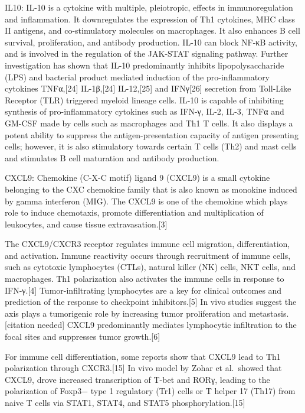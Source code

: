 \documentclass[
]{article}
\begin{document}
IL10: IL-10 is a cytokine with multiple, pleiotropic, effects in
immunoregulation and inflammation. It downregulates the expression of
Th1 cytokines, MHC class II antigens, and co-stimulatory molecules on
macrophages. It also enhances B cell survival, proliferation, and
antibody production. IL-10 can block NF-κB activity, and is involved in
the regulation of the JAK-STAT signaling pathway. Further investigation
has shown that IL-10 predominantly inhibits lipopolysaccharide (LPS) and
bacterial product mediated induction of the pro-inflammatory cytokines
TNFα,{[}24{]} IL-1β,{[}24{]} IL-12,{[}25{]} and IFNγ{[}26{]} secretion
from Toll-Like Receptor (TLR) triggered myeloid lineage cells. IL-10 is
capable of inhibiting synthesis of pro-inflammatory cytokines such as
IFN-γ, IL-2, IL-3, TNFα and GM-CSF made by cells such as macrophages and
Th1 T cells. It also displays a potent ability to suppress the
antigen-presentation capacity of antigen presenting cells; however, it
is also stimulatory towards certain T cells (Th2) and mast cells and
stimulates B cell maturation and antibody production.

CXCL9: Chemokine (C-X-C motif) ligand 9 (CXCL9) is a small cytokine
belonging to the CXC chemokine family that is also known as monokine
induced by gamma interferon (MIG). The CXCL9 is one of the chemokine
which plays role to induce chemotaxis, promote differentiation and
multiplication of leukocytes, and cause tissue extravasation.{[}3{]}

The CXCL9/CXCR3 receptor regulates immune cell migration,
differentiation, and activation. Immune reactivity occurs through
recruitment of immune cells, such as cytotoxic lymphocytes (CTLs),
natural killer (NK) cells, NKT cells, and macrophages. Th1 polarization
also activates the immune cells in response to IFN-γ.{[}4{]}
Tumor-infiltrating lymphocytes are a key for clinical outcomes and
prediction of the response to checkpoint inhibitors.{[}5{]} In vivo
studies suggest the axis plays a tumorigenic role by increasing tumor
proliferation and metastasis.{[}citation needed{]} CXCL9 predominantly
mediates lymphocytic infiltration to the focal sites and suppresses
tumor growth.{[}6{]}

For immune cell differentiation, some reports show that CXCL9 lead to
Th1 polarization through CXCR3.{[}15{]} In vivo model by Zohar et
al.~showed that CXCL9, drove increased transcription of T-bet and RORγ,
leading to the polarization of Foxp3− type 1 regulatory (Tr1) cells or T
helper 17 (Th17) from naive T cells via STAT1, STAT4, and STAT5
phosphorylation.{[}15{]}
\end{document}
